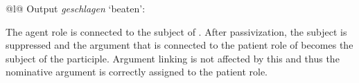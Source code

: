 \begin{tabular}[t]{@{}l@{}}
Output \emph{geschlagen} `beaten':\\
\end{tabular}
\zl
The agent role is connected to the subject of . After passivization, the subject is suppressed and the argument that is connected to
the patient role of  becomes the subject of the participle. Argument linking is not affected by this and thus the nominative argument is
correctly assigned to the patient role.

